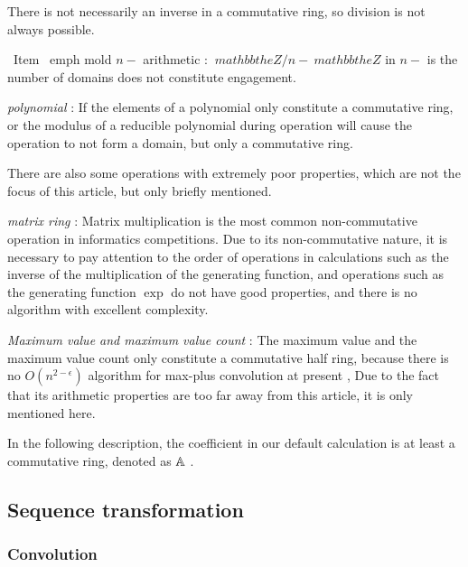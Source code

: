 \begin { asparadesc }
\item [Commutative ring] There is not necessarily an inverse in a commutative ring, so division is not always possible.

\begin { itemize }
\ Item  \ emph { mold $ n- $ arithmetic }: $ \ mathbb the Z / n- \ mathbb the Z $ in $ n- $ is the number of domains does not constitute engagement.
\item  \emph { polynomial }: If the elements of a polynomial only constitute a commutative ring, or the modulus of a reducible polynomial during operation will cause the operation to not form a domain, but only a commutative ring.
\end { itemize }

\item [Miscellaneous] There are also some operations with extremely poor properties, which are not the focus of this article, but only briefly mentioned.

\begin { itemize }
\item  \emph { matrix ring }: Matrix multiplication is the most common non-commutative operation in informatics competitions. Due to its non-commutative nature, it is necessary to pay attention to the order of operations in calculations such as the inverse of the multiplication of the generating function, and operations such as the generating function $ \exp $ do not have good properties, and there is no algorithm with excellent complexity.
\item  \emph { Maximum value and maximum value count }: The maximum value and the maximum value count only constitute a commutative half ring, because there is no $ O(n^{2- \epsilon }) $ algorithm for max-plus convolution at present , Due to the fact that its arithmetic properties are too far away from this article, it is only mentioned here.
\end { itemize }

\end { asparadesc }

In the following description, the coefficient in our default calculation is at least a commutative ring, denoted as $  \mathbb A $ .

\subsection { Sequence transformation }

\subsubsection { Convolution }


